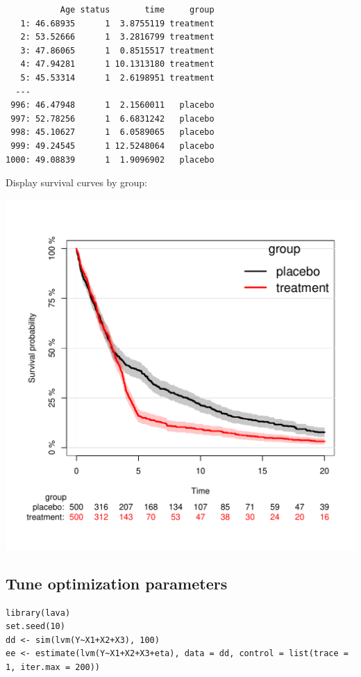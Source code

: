 \documentclass{article}
\begin{document}
\begin{verbatim}
           Age status       time     group
   1: 46.68935      1  3.8755119 treatment
   2: 53.52666      1  3.2816799 treatment
   3: 47.86065      1  0.8515517 treatment
   4: 47.94281      1 10.1313180 treatment
   5: 45.53314      1  2.6198951 treatment
  ---                                     
 996: 46.47948      1  2.1560011   placebo
 997: 52.78256      1  6.6831242   placebo
 998: 45.10627      1  6.0589065   placebo
 999: 49.24545      1 12.5248064   placebo
1000: 49.08839      1  1.9096902   placebo
\end{verbatim}

Display survival curves by group:
\begin{center}
\includegraphics[width=.9\linewidth]{./figures/fig-delayedTreatmentEffect.pdf}
\end{center}

\subsection{Tune optimization parameters}
\label{sec:orge1028dc}

\lstset{language=r,label= ,caption= ,captionpos=b,numbers=none}
\begin{lstlisting}
library(lava)
set.seed(10)
dd <- sim(lvm(Y~X1+X2+X3), 100)
ee <- estimate(lvm(Y~X1+X2+X3+eta), data = dd, control = list(trace = 1, iter.max = 200))
\end{lstlisting}
\end{document}
